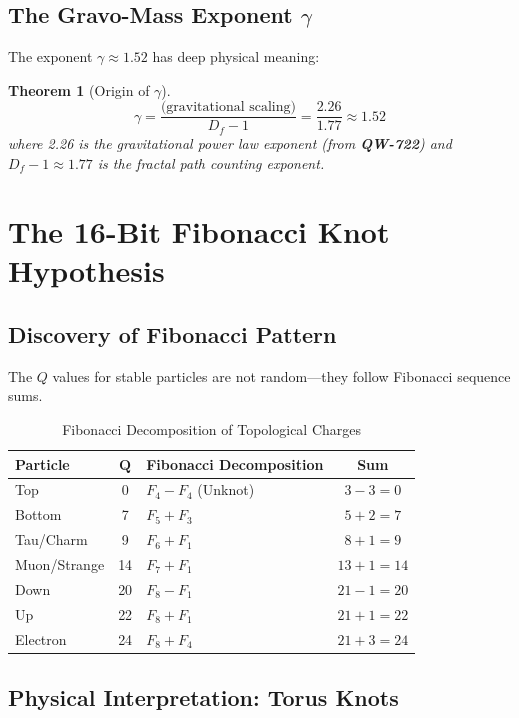 \documentclass[11pt,a4paper]{book}
\newtheorem{theorem}{Theorem}[section]
\theoremstyle{remark}
\newcommand{\QW}[1]{\textbf{QW-#1}}
\begin{document}
\subsection{The Gravo-Mass Exponent $\gamma$}

The exponent $\gamma \approx 1.52$ has deep physical meaning:

\begin{theorem}[Origin of $\gamma$]
\begin{equation}
\gamma = \frac{\text{(gravitational scaling)}}{D_f - 1} = \frac{2.26}{1.77} \approx 1.52
\end{equation}
where 2.26 is the gravitational power law exponent (from \QW{722}) and $D_f - 1 \approx 1.77$ is the fractal path counting exponent.
\end{theorem}

\section{The 16-Bit Fibonacci Knot Hypothesis}

\subsection{Discovery of Fibonacci Pattern}

The $Q$ values for stable particles are not random—they follow Fibonacci sequence sums.

\begin{table}[H]
\centering
\caption{Fibonacci Decomposition of Topological Charges}
\begin{tabular}{|l|c|l|c|}
\hline
\textbf{Particle} & $\mathbf{Q}$ & \textbf{Fibonacci Decomposition} & \textbf{Sum} \\
\hline
Top & 0 & $F_4 - F_4$ (Unknot) & $3 - 3 = 0$ \\
Bottom & 7 & $F_5 + F_3$ & $5 + 2 = 7$ \\
Tau/Charm & 9 & $F_6 + F_1$ & $8 + 1 = 9$ \\
Muon/Strange & 14 & $F_7 + F_1$ & $13 + 1 = 14$ \\
Down & 20 & $F_8 - F_1$ & $21 - 1 = 20$ \\
Up & 22 & $F_8 + F_1$ & $21 + 1 = 22$ \\
Electron & 24 & $F_8 + F_4$ & $21 + 3 = 24$ \\
\hline
\end{tabular}
\end{table}

\subsection{Physical Interpretation: Torus Knots}
\end{document}
